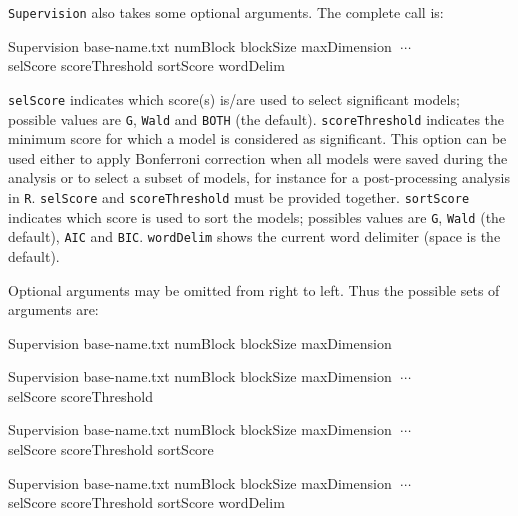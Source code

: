 \documentclass[a4paper,11pt]{article}
\newcommand{\prog}[1]{\texttt{#1}}
\newenvironment{launch}{\begin{mdframed}\ttfamily}{\end{mdframed}}
\begin{document}
\prog{Supervision} also takes some optional arguments. The complete call is:
\begin{launch}
Supervision base-name.txt numBlock blockSize maxDimension $\; \cdots$\\
\indent selScore scoreThreshold sortScore wordDelim
\end{launch}
\noindent \verb+selScore+ indicates which score(s) is/are used to select significant models; possible values are \verb+G+, \verb+Wald+ and \verb+BOTH+ (the default).
\verb+scoreThreshold+ indicates the minimum score for which a model is considered as significant. 
This option can be used either to apply Bonferroni correction when all models were saved during the analysis or to select a subset of models, for instance for a post-processing analysis in \prog{R}.
\verb+selScore+ and \verb+scoreThreshold+ must be provided together.
\verb+sortScore+ indicates which score is used to sort the models; possibles values are \verb+G+, \verb+Wald+ (the default), \verb+AIC+ and \verb+BIC+.
\verb+wordDelim+ shows the current word delimiter (space is the default).

Optional arguments may be omitted from right to left. Thus the possible sets of arguments are:

\begin{launch}Supervision base-name.txt numBlock blockSize maxDimension\end{launch}
\begin{launch}Supervision base-name.txt numBlock blockSize maxDimension $\; \cdots$\\
\indent selScore scoreThreshold\end{launch}
\begin{launch}Supervision base-name.txt numBlock blockSize maxDimension $\; \cdots$\\
\indent selScore scoreThreshold sortScore \end{launch}
\begin{launch}Supervision base-name.txt numBlock blockSize maxDimension $\; \cdots$\\
\indent selScore scoreThreshold sortScore wordDelim \end{launch}
\end{document}
